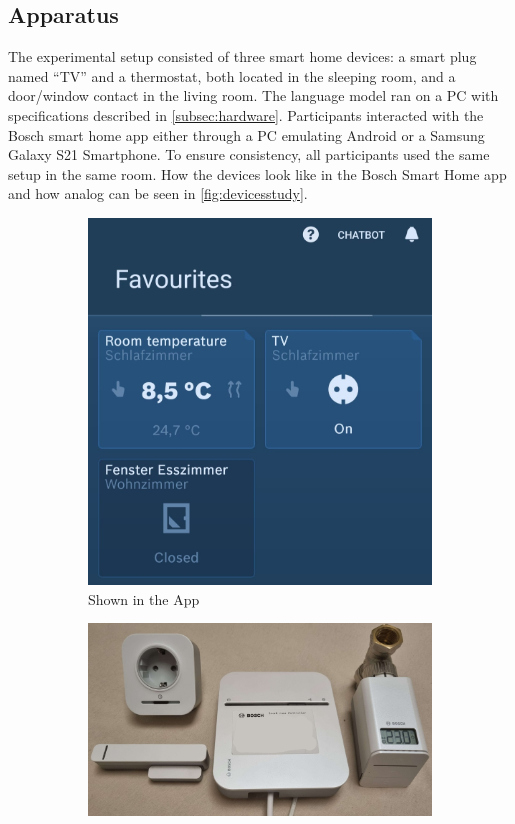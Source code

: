 \subsection{Apparatus}
The experimental setup consisted of three smart home devices: a smart plug named ``TV'' and a thermostat, both located in the sleeping room, and a door/window contact in the living room. The language model ran on a PC with specifications described in \cref{subsec:hardware}. Participants interacted with the Bosch smart home app either through a PC emulating Android or a Samsung Galaxy S21 Smartphone. To ensure consistency, all participants used the same setup in the same room.
How the devices look like in the Bosch Smart Home app and how analog can be seen in \cref{fig:devicesstudy}.
\begin{figure}[h]
    \centering
      \begin{subfigure}{.35\textwidth}
        \captionsetup{justification=centering}
        \includegraphics[width=\textwidth]{graphics/devices.jpeg}
        \caption{Shown in the App}
        \label{fig:devicesapp}
      \end{subfigure} \hfill
      \begin{subfigure}{.6\textwidth}
        \includegraphics[width=\textwidth]{graphics/devices-rl.jpeg}

\end{subfigure}
\end{figure}
